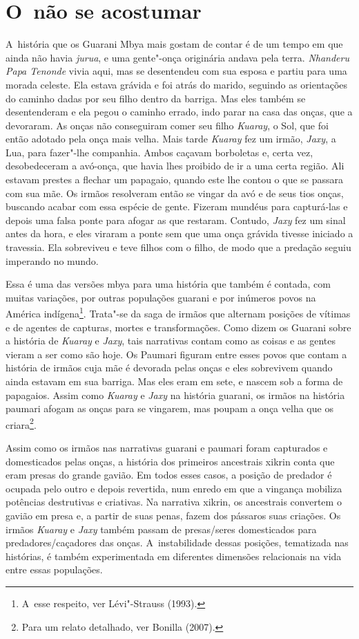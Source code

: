 \section{O~não se acostumar}

A~história que os Guarani Mbya mais gostam de contar é de um tempo em
que ainda não havia \emph{jurua}, e uma gente"-onça originária andava pela
terra. \emph{Nhanderu Papa Tenonde} vivia aqui, mas se desentendeu com sua
esposa e partiu para uma morada celeste. Ela estava grávida e foi atrás
do marido, seguindo as orientações do caminho dadas por seu filho
dentro da barriga. Mas eles também se desentenderam e ela pegou o
caminho errado, indo parar na casa das onças, que a devoraram. As onças
não conseguiram comer seu filho \emph{Kuaray}, o Sol, que foi então adotado
pela onça mais velha. Mais tarde \emph{Kuaray} fez um irmão, \emph{Jaxy}, a Lua, para
fazer"-lhe companhia. Ambos caçavam borboletas e, certa vez,
desobedeceram a avó-onça, que havia lhes proibido de ir a uma certa
região. Ali estavam prestes a flechar um papagaio, quando este lhe
contou o que se passara com sua mãe. Os irmãos resolveram então se
vingar da avó e de seus tios onças, buscando acabar com essa espécie de
gente. Fizeram mundéus para capturá-las e depois uma falsa ponte para
afogar as que restaram. Contudo, \emph{Jaxy} fez um sinal antes da hora, e
eles viraram a ponte sem que uma onça grávida tivesse iniciado a
travessia. Ela sobreviveu e teve filhos com o filho, de modo que a
predação seguiu imperando no mundo.

Essa é uma das versões mbya para uma história que também é contada, com
muitas variações, por outras populações guarani e por inúmeros povos na
América indígena\footnote{A~esse respeito, ver Lévi"-Strauss (1993).}.
Trata"-se da saga de irmãos que alternam posições de vítimas e de
agentes de capturas, mortes e transformações. Como dizem os Guarani
sobre a história de \emph{Kuaray} e \emph{Jaxy}, tais narrativas contam como as
coisas e as gentes vieram a ser como são hoje. Os Paumari figuram entre
esses povos que contam a história de irmãos cuja mãe é devorada pelas
onças e eles sobrevivem quando ainda estavam em sua barriga. Mas eles
eram em sete, e nascem sob a forma de papagaios. Assim como \emph{Kuaray} e
\emph{Jaxy} na história guarani, os irmãos na história paumari afogam as onças
para se vingarem, mas poupam a onça velha que os criara\footnote{Para
um relato detalhado, ver Bonilla (2007).}.

Assim como os irmãos nas narrativas guarani e paumari foram capturados e
domesticados pelas onças, a história dos primeiros ancestrais xikrin
conta que eram presas do grande gavião. Em todos esses casos, a posição
de predador é ocupada pelo outro e depois revertida, num enredo em que
a vingança mobiliza potências destrutivas e criativas. Na narrativa
xikrin, os ancestrais convertem o gavião em presa e, a partir de suas
penas, fazem dos pássaros suas criações. Os irmãos \emph{Kuaray} e \emph{Jaxy} também
passam de presas/seres domesticados para predadores/caçadores das
onças. A~instabilidade dessas posições, tematizada nas histórias, é
também experimentada em diferentes dimensões relacionais na vida entre
essas populações. 

